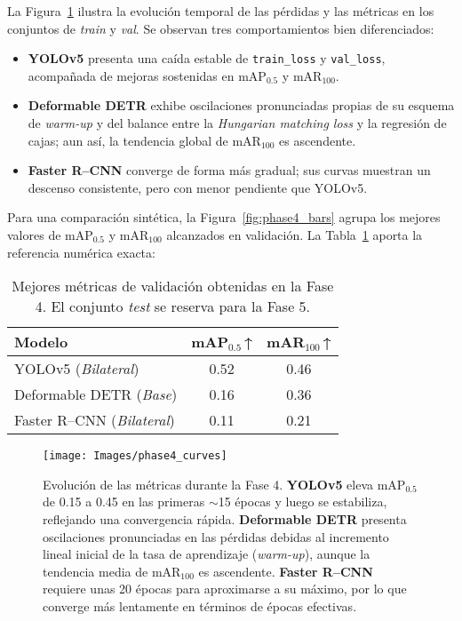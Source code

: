 La Figura~\ref{fig:phase4_curves} ilustra la evolución temporal de las pérdidas y las métricas en los conjuntos de \textit{train} y \textit{val}.
Se observan tres comportamientos bien diferenciados:

\begin{itemize}
  \item \textbf{YOLOv5} presenta una caída estable de \texttt{train\_loss} y \texttt{val\_loss}, acompañada de mejoras sostenidas en mAP\(_{0.5}\) y mAR\(_{100}\).
  \item \textbf{Deformable DETR} exhibe oscilaciones pronunciadas propias de su esquema de \emph{warm-up} y del balance entre la \emph{Hungarian matching loss} y la regresión de cajas; aun así, la tendencia global de mAR\(_{100}\) es ascendente.
  \item \textbf{Faster R–CNN} converge de forma más gradual; sus curvas muestran un descenso consistente, pero con menor pendiente que YOLOv5.
\end{itemize}

Para una comparación sintética, la Figura~\ref{fig:phase4_bars} agrupa los mejores valores de mAP\(_{0.5}\) y mAR\(_{100}\) alcanzados en validación.
La Tabla~\ref{tab:phase4_val} aporta la referencia numérica exacta:

\begin{table}[!ht]
  \centering
  \caption{Mejores métricas de validación obtenidas en la Fase 4.
           El conjunto \textit{test} se reserva para la Fase 5.}
  \label{tab:phase4_val}
  \begin{tabular}{lcc}
    \hline
    Modelo & mAP\(_{0.5}\)\,↑ & mAR\(_{100}\)\,↑\\
    \hline
    YOLOv5 (\textit{Bilateral})        & 0.52 & 0.46\\
    Deformable DETR (\textit{Base})    & 0.16 & 0.36\\
    Faster R--CNN (\textit{Bilateral}) & 0.11 & 0.21\\
    \hline
  \end{tabular}
\end{table}

\begin{figure}[!ht]
  \centering
  \texttt{[image: Images/phase4\_curves]}
  \caption[Evolución de las métricas durante la Fase 4 (resumen)]%
          {Evolución de las métricas durante la Fase 4.%
          \textbf{YOLOv5} eleva mAP\(_{0.5}\) de 0.15 a 0.45 en las primeras \(\sim\)15 épocas y luego se estabiliza, reflejando una convergencia rápida.%
          \textbf{Deformable DETR} presenta oscilaciones pronunciadas en las pérdidas debidas al incremento lineal inicial de la tasa de aprendizaje (\emph{warm-up})\footnotemark, aunque la tendencia media de mAR\(_{100}\) es ascendente.%
          \textbf{Faster R--CNN} requiere unas 20 épocas para aproximarse a su máximo, por lo que converge más lentamente en términos de épocas efectivas.}%
  \label{fig:phase4_curves}
\end{figure}

